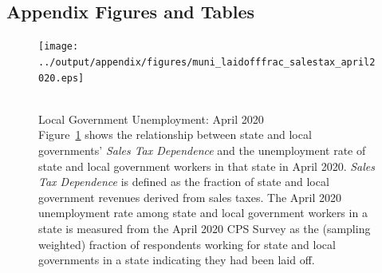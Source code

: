 \subsection*{Appendix Figures and Tables}

\clearpage



\begin{center}
\begin{figure}[!ht]
	\centering
	\caption{\\ Local Government Unemployment: April 2020 \\
	{\small Figure~\ref{figure:unconditionalScatterSalesShare} shows the relationship between state and local governments' \emph{Sales Tax Dependence} and the unemployment rate of state and local government workers in that state in April 2020. \emph{Sales Tax Dependence} is defined as the fraction of state and local government revenues derived from sales taxes. The April 2020 unemployment rate among state and local government workers in a state is measured from the April 2020 CPS Survey as the (sampling weighted) fraction of respondents working for state and local governments in a state indicating they had been laid off.}}
	\label{figure:unconditionalScatterSalesShare}
	\texttt{[image: ../output/appendix/figures/muni\_laidofffrac\_salestax\_april2020.eps]}
\end{figure}
\end{center}




